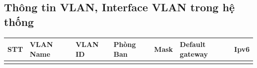\documentclass[12pt,a4paper]{report}
\begin{document}
\subsection{Thông tin VLAN, Interface VLAN trong hệ thống}
\begin{center}
\def\arraystretch{2.1}\begin{longtable}{|p{}|p{}|p{}|p{}|p{}|p{}|p{}|}


\hline \textbf{STT } &  \textbf{VLAN Name } &  \textbf{VLAN ID } &  \textbf{Phòng Ban } &  \textbf{Mask} &  \textbf{Default gateway } &  \textbf{Ipv6} \\ \hline
\endfirsthead


\endhead


\endfoot


\endlastfoot


\end{longtable}
\end{center}
\end{document}
